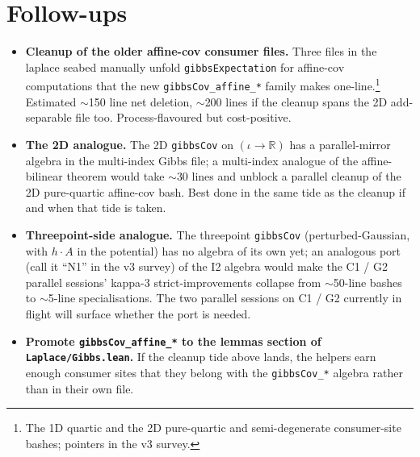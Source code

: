 \documentclass[11pt]{article}
\begin{document}
\section{Follow-ups}

\begin{itemize}[leftmargin=*]

\item \textbf{Cleanup of the older affine-cov consumer files.} Three
files in the laplace seabed manually unfold \texttt{gibbsExpectation}
for affine-cov computations that the new \texttt{gibbsCov\_affine\_*}
family makes one-line.\footnote{The 1D quartic and the 2D pure-quartic
and semi-degenerate consumer-site bashes; pointers in the v3 survey.}
Estimated $\sim$150 line net deletion, $\sim$200 lines if the cleanup
spans the 2D add-separable file too. Process-flavoured but cost-positive.

\item \textbf{The 2D analogue.} The 2D \texttt{gibbsCov} on
$(\iota \to \mathbb{R})$ has a parallel-mirror algebra in the
multi-index Gibbs file; a multi-index analogue of the affine-bilinear
theorem would take $\sim$30 lines and unblock a parallel cleanup of
the 2D pure-quartic affine-cov bash. Best done in the same tide as
the cleanup if and when that tide is taken.

\item \textbf{Threepoint-side analogue.} The threepoint
\texttt{gibbsCov} (perturbed-Gaussian, with $h \cdot A$ in the
potential) has no algebra of its own yet; an analogous port (call it
``N1'' in the v3 survey) of the I2 algebra would make the C1 / G2
parallel sessions' kappa-3 strict-improvements collapse from
$\sim$50-line bashes to $\sim$5-line specialisations. The two parallel
sessions on C1 / G2 currently in flight will surface whether the port
is needed.

\item \textbf{Promote \texttt{gibbsCov\_affine\_*} to the lemmas section
of \texttt{Laplace/Gibbs.lean}.} If the cleanup tide above lands, the
helpers earn enough consumer sites that they belong with the
\texttt{gibbsCov\_*} algebra rather than in their own file.

\end{itemize}
\end{document}
